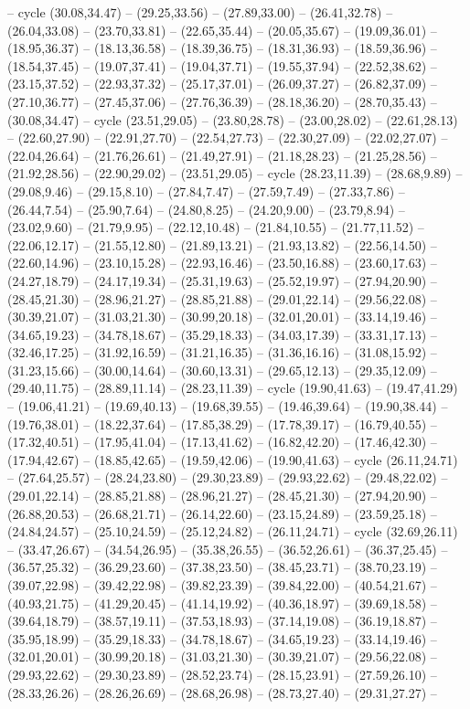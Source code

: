 {-- cycle (30.08,34.47) -- (29.25,33.56) -- (27.89,33.00) -- (26.41,32.78) -- (26.04,33.08) -- (23.70,33.81) -- (22.65,35.44) -- (20.05,35.67) -- (19.09,36.01) -- (18.95,36.37) -- (18.13,36.58) -- (18.39,36.75) -- (18.31,36.93) -- (18.59,36.96) -- (18.54,37.45) -- (19.07,37.41) -- (19.04,37.71) -- (19.55,37.94) -- (22.52,38.62) -- (23.15,37.52) -- (22.93,37.32) -- (25.17,37.01) -- (26.09,37.27) -- (26.82,37.09) -- (27.10,36.77) -- (27.45,37.06) -- (27.76,36.39) -- (28.18,36.20) -- (28.70,35.43) -- (30.08,34.47) -- cycle (23.51,29.05) -- (23.80,28.78) -- (23.00,28.02) -- (22.61,28.13) -- (22.60,27.90) -- (22.91,27.70) -- (22.54,27.73) -- (22.30,27.09) -- (22.02,27.07) -- (22.04,26.64) -- (21.76,26.61) -- (21.49,27.91) -- (21.18,28.23) -- (21.25,28.56) -- (21.92,28.56) -- (22.90,29.02) -- (23.51,29.05) -- cycle (28.23,11.39) -- (28.68,9.89) -- (29.08,9.46) -- (29.15,8.10) -- (27.84,7.47) -- (27.59,7.49) -- (27.33,7.86) -- (26.44,7.54) -- (25.90,7.64) -- (24.80,8.25) -- (24.20,9.00) -- (23.79,8.94) -- (23.02,9.60) -- (21.79,9.95) -- (22.12,10.48) -- (21.84,10.55) -- (21.77,11.52) -- (22.06,12.17) -- (21.55,12.80) -- (21.89,13.21) -- (21.93,13.82) -- (22.56,14.50) -- (22.60,14.96) -- (23.10,15.28) -- (22.93,16.46) -- (23.50,16.88) -- (23.60,17.63) -- (24.27,18.79) -- (24.17,19.34) -- (25.31,19.63) -- (25.52,19.97) -- (27.94,20.90) -- (28.45,21.30) -- (28.96,21.27) -- (28.85,21.88) -- (29.01,22.14) -- (29.56,22.08) -- (30.39,21.07) -- (31.03,21.30) -- (30.99,20.18) -- (32.01,20.01) -- (33.14,19.46) -- (34.65,19.23) -- (34.78,18.67) -- (35.29,18.33) -- (34.03,17.39) -- (33.31,17.13) -- (32.46,17.25) -- (31.92,16.59) -- (31.21,16.35) -- (31.36,16.16) -- (31.08,15.92) -- (31.23,15.66) -- (30.00,14.64) -- (30.60,13.31) -- (29.65,12.13) -- (29.35,12.09) -- (29.40,11.75) -- (28.89,11.14) -- (28.23,11.39) -- cycle (19.90,41.63) -- (19.47,41.29) -- (19.06,41.21) -- (19.69,40.13) -- (19.68,39.55) -- (19.46,39.64) -- (19.90,38.44) -- (19.76,38.01) -- (18.22,37.64) -- (17.85,38.29) -- (17.78,39.17) -- (16.79,40.55) -- (17.32,40.51) -- (17.95,41.04) -- (17.13,41.62) -- (16.82,42.20) -- (17.46,42.30) -- (17.94,42.67) -- (18.85,42.65) -- (19.59,42.06) -- (19.90,41.63) -- cycle (26.11,24.71) -- (27.64,25.57) -- (28.24,23.80) -- (29.30,23.89) -- (29.93,22.62) -- (29.48,22.02) -- (29.01,22.14) -- (28.85,21.88) -- (28.96,21.27) -- (28.45,21.30) -- (27.94,20.90) -- (26.88,20.53) -- (26.68,21.71) -- (26.14,22.60) -- (23.15,24.89) -- (23.59,25.18) -- (24.84,24.57) -- (25.10,24.59) -- (25.12,24.82) -- (26.11,24.71) -- cycle (32.69,26.11) -- (33.47,26.67) -- (34.54,26.95) -- (35.38,26.55) -- (36.52,26.61) -- (36.37,25.45) -- (36.57,25.32) -- (36.29,23.60) -- (37.38,23.50) -- (38.45,23.71) -- (38.70,23.19) -- (39.07,22.98) -- (39.42,22.98) -- (39.82,23.39) -- (39.84,22.00) -- (40.54,21.67) -- (40.93,21.75) -- (41.29,20.45) -- (41.14,19.92) -- (40.36,18.97) -- (39.69,18.58) -- (39.64,18.79) -- (38.57,19.11) -- (37.53,18.93) -- (37.14,19.08) -- (36.19,18.87) -- (35.95,18.99) -- (35.29,18.33) -- (34.78,18.67) -- (34.65,19.23) -- (33.14,19.46) -- (32.01,20.01) -- (30.99,20.18) -- (31.03,21.30) -- (30.39,21.07) -- (29.56,22.08) -- (29.93,22.62) -- (29.30,23.89) -- (28.52,23.74) -- (28.15,23.91) -- (27.59,26.10) -- (28.33,26.26) -- (28.26,26.69) -- (28.68,26.98) -- (28.73,27.40) -- (29.31,27.27) -- }

